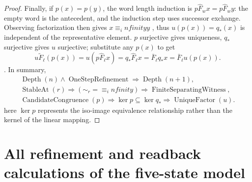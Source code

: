 \documentclass[12pt,a4paper,openany,notitlepage]{report}
\theoremstyle{plain}
\theoremstyle{definition}
\theoremstyle{remark}
\def\infty{infinity}\def\Gamma{Gamma}\def\Phi{Phi}%
\begin{document}
\begin{CJK*}
\begin{proof}
Finally, if $p(x)=p(y)$, the word length induction is $p\widehat F_wx=p\widehat F_wy$: the empty word is the antecedent, and the induction step uses successor exchange. Observing factorization then gives $x\equiv_\infty y$ , thus $u(p(x))=q_*(x)$ is independent of the representative element. $p$ surjective gives uniqueness, $q_*$ surjective gives $u$ surjective; substitute any $p(x)$ to get \[
 u\widetilde F_\ell(p(x))
 =u(p\widehat F_\ell x)
 =q_*\widehat F_\ell x
 =\bar F_\ell q_*x
 =\bar F_\ell u(p(x)).
\]. In summary, \[
\begin{gathered}
 \operatorname{Depth}(n)\land\operatorname{OneStepRefinement}
 \Rightarrow\operatorname{Depth}(n+1),\\
 \operatorname{StableAt}(r)
 \Rightarrow (\sim_r=\equiv_\infty)
 \Rightarrow\operatorname{FiniteSeparatingWitness},\\
 \operatorname{CandidateCongruence}(p)
 \Rightarrow\ker p\subseteq\ker q_*
 \Rightarrow\operatorname{UniqueFactor}(u).
\end{gathered}
\] here $\ker p$ represents the iso-image equivalence relationship rather than the kernel of the linear mapping.\end{proof}


\section { All refinement and readback calculations of the five-state model }\label{exp:gov:finite-example-section}



\end{CJK*}
\end{document}
